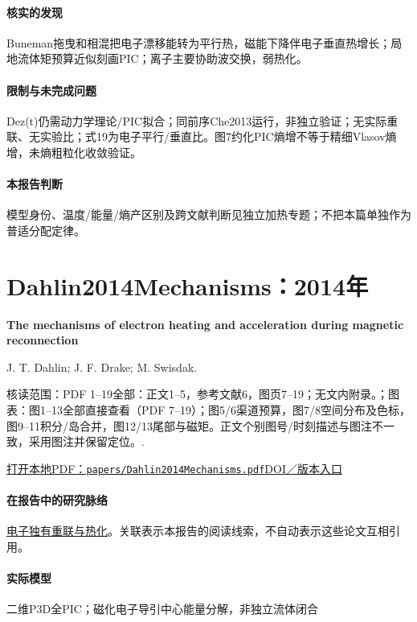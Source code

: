 \paragraph{核实的发现}Buneman拖曳和相混把电子漂移能转为平行热，磁能下降伴电子垂直热增长；局地流体矩预算近似刻画PIC；离子主要协助波交换，弱热化。

\paragraph{限制与未完成问题}Dez(t)仍需动力学理论/PIC拟合；同前序Che2013运行，非独立验证；无实际重联、无实验比；式19为电子平行/垂直比。图7约化PIC熵增不等于精细Vlasov熵增，未熵粗粒化收敛验证。

\paragraph{本报告判断}模型身份、温度/能量/熵产区别及跨文献判断见独立加热专题；不把本篇单独作为普适分配定律。

\section{Dahlin2014Mechanisms：2014年}\label{paper:Dahlin2014Mechanisms}

\textbf{The mechanisms of electron heating and acceleration during magnetic reconnection}\citep{Dahlin2014Mechanisms}\

J. T. Dahlin;  J. F. Drake;  M. Swisdak.

\textsf{核读范围：}PDF 1–19全部：正文1–5，参考文献6，图页7–19；无文内附录。；\textsf{图表：}图1–13全部直接查看（PDF 7–19）；图5/6渠道预算，图7/8空间分布及色标，图9–11积分/岛合并，图12/13尾部与磁矩。正文个别图号/时刻描述与图注不一致，采用图注并保留定位。.

\href{run:papers/Dahlin2014Mechanisms.pdf}{打开本地PDF：\texttt{papers/Dahlin2014Mechanisms.pdf}}\quad\href{https://doi.org/10.1063/1.4894484}{DOI／版本入口}

\paragraph{在报告中的研究脉络}\hyperref[story:energy]{电子独有重联与热化}。关联表示本报告的阅读线索，不自动表示这些论文互相引用。

\paragraph{实际模型}二维P3D全PIC；磁化电子导引中心能量分解，非独立流体闭合

